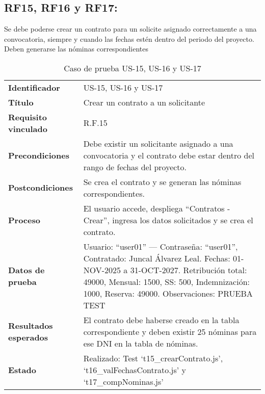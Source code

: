 \subsection*{RF15, RF16 y RF17:} Se debe poderse crear un contrato para un solicite asignado correctamente a una convocatoria, siempre y cuando las fechas estén dentro del periodo del proyecto. Deben generarse las nóminas correspondientes
\begin{table}[H]
	\centering
	\small
	\caption{Caso de prueba US-15, US-16 y US-17}
	\label{tab:caso_uso15}
	\begin{tabular}{>{\bfseries}l p{11cm}}
		Identificador & US-15, US-16 y US-17 \\
		Título & Crear un contrato a un solicitante \\
		Requisito vinculado & R.F.15 \\
		Precondiciones & Debe existir un solicitante asignado a una convocatoria y el contrato debe estar dentro del rango de fechas del proyecto. \\
		Postcondiciones & Se crea el contrato y se generan las nóminas correspondientes. \\
		Proceso & El usuario accede, despliega “Contratos - Crear”, ingresa los datos solicitados y se crea el contrato. \\
		Datos de prueba & Usuario: “user01” — Contraseña: “user01”, Contratado: Juncal Álvarez Leal.  
		Fechas: 01-NOV-2025 a 31-OCT-2027.  
		Retribución total: 49000, Mensual: 1500, SS: 500, Indemnización: 1000, Reserva: 49000.  
		Observaciones: PRUEBA TEST \\
		Resultados esperados & El contrato debe haberse creado en la tabla correspondiente y deben existir 25 nóminas para ese DNI en la tabla de nóminas. \\
		Estado & Realizado: Test `t15\_crearContrato.js', `t16\_valFechasContrato.js' y `t17\_compNominas.js' \\
	\end{tabular}
\end{table}

